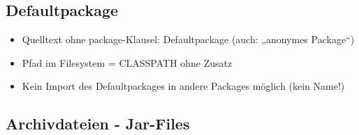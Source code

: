 \subsection{Defaultpackage}
\begin{itemize}
\item Quelltext ohne package-Klausel: Defaultpackage (auch: „anonymes  Package“)
\item Pfad im Filesystem = CLASSPATH ohne Zusatz
\item Kein Import des Defaultpackages in andere Packages möglich (kein Name!)
\end{itemize}

\subsection{Archivdateien - Jar-Files}
